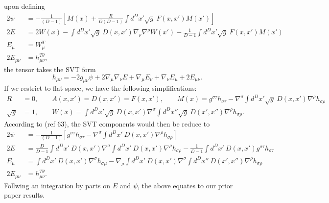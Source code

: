 \documentclass[10pt,letterpaper]{article}
\numberwithin{equation}{subsection}
\begin{document}
upon defining
\begin{align}
2\psi &= -\frac{1}{(D-1)}\left[ M(x) + \frac{R}{D(D-1)} \int   d^Dx' \sqrt{g}\ F(x,x') M(x') \right]
\nonumber\\
2E&= 2W(x)- \int d^Dx' \sqrt{g}\ D(x,x')\nabla_\rho \nabla^\rho W(x') - \frac{1}{D-1} \int  d^Dx' \sqrt{g}\ F(x,x') M(x')
\nonumber\\
E_{\mu}&= W_{\mu}^T
\nonumber\\
2E_{\mu\nu} &= h_{\mu\nu}^{T\theta},
\end{align}
the tensor takes the SVT form
\begin{equation}
h_{\mu\nu} = -2 g_{\mu\nu}\psi + 2\nabla_\mu \nabla_\nu E + \nabla_\mu E_\nu +\nabla_\nu E_\mu + 2E_{\mu\nu}.
\end{equation}
If we restrict to flat space, we have the following simplifications:
\begin{align}
R &= 0,\qquad A(x,x') = D(x,x') = F(x,x'),\qquad M(x) =  g^{\sigma\tau}h_{\sigma\tau} - \nabla^\sigma \int d^Dx' \sqrt{g}\ D(x,x') \nabla^\rho h_{\sigma\rho}
\nonumber\\
\sqrt g &= 1,\qquad W(x) = \int d^Dx' \sqrt{g}\ D(x,x') \nabla^\sigma  \int   d^Dx'' \sqrt{g}\ D(x',x'') \nabla^\rho h_{\sigma\rho}.
\end{align}
According to (ref 63), the SVT components would then be reduce to
\begin{align}
2\psi &= -\frac{1}{(D-1)}\left[  g^{\sigma\tau}h_{\sigma\tau} - \nabla^\sigma \int d^Dx' \ D(x,x') \nabla^\rho h_{\sigma\rho} \right]
\nonumber\\
2E&= \frac{D}{D-1} \int d^Dx'\ D(x,x') \nabla^\sigma  \int   d^Dx' \ D(x,x') \nabla^\rho h_{\sigma\rho}
 - \frac{1}{D-1} \int  d^Dx' \ D(x,x') g^{\sigma\tau}h_{\sigma\tau}
\nonumber\\
E_{\mu}&=  \int d^Dx' \ D(x,x')\nabla^\sigma h_{\sigma\mu} - \nabla_\mu \int d^Dx' \ D(x,x')
\nabla^\sigma \int d^Dx'' \ D(x',x'') \nabla^\rho h_{\sigma\rho}
\nonumber\\
2E_{\mu\nu} &= h_{\mu\nu}^{T\theta}.
\end{align}
Follwing an integration by parts on $E$ and $\psi$, the above equates to our prior paper results. 
\end{document}
